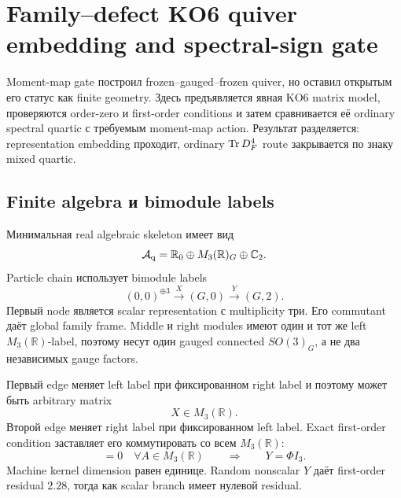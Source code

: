 \chapter{Family--defect KO6 quiver embedding and spectral-sign gate}

Moment-map gate построил frozen--gauged--frozen quiver, но оставил открытым
его статус как finite geometry. Здесь предъявляется явная KO6 matrix model,
проверяются order-zero и first-order conditions и затем сравнивается её
ordinary spectral quartic с требуемым moment-map action. Результат
разделяется: representation embedding проходит, ordinary
\(\operatorname{Tr} D_F^4\) route закрывается по знаку mixed quartic.

\section{Finite algebra и bimodule labels}

Минимальная real algebraic skeleton имеет вид
\begin{equation}
 \mathcal A_{\rm q}
 =\mathbb R_0\oplus M_3(\mathbb R)_G\oplus\mathbb C_2.
 \label{eq:family-quiver-finite-algebra}
\end{equation}
Particle chain использует bimodule labels
\begin{equation}
 (0,0)^{\oplus3}
 \xrightarrow{\ X\ }
 (G,0)
 \xrightarrow{\ Y\ }
 (G,2).
 \label{eq:family-krajewski-label-chain}
\end{equation}
Первый node является scalar representation с multiplicity три. Его
commutant даёт global family frame. Middle и right modules имеют один и тот
же left \(M_3(\mathbb R)\)-label, поэтому несут один gauged connected
\(SO(3)_G\), а не два независимых gauge factors.

Первый edge меняет left label при фиксированном right label и поэтому может
быть arbitrary matrix
\begin{equation}
 X\in M_3(\mathbb R).
\end{equation}
Второй edge меняет right label при фиксированном left label. Exact
first-order condition заставляет его коммутировать со всем
\(M_3(\mathbb R)\):
\begin{equation}
 [Y,A]=0\quad\forall A\in M_3(\mathbb R)
 \qquad\Longrightarrow\qquad
 Y=\Phi I_3.
 \label{eq:first-order-schur-pairing}
\end{equation}
Machine kernel dimension равен единице. Random nonscalar \(Y\) даёт
first-order residual \(2.28\), тогда как scalar branch имеет нулевой
residual.

